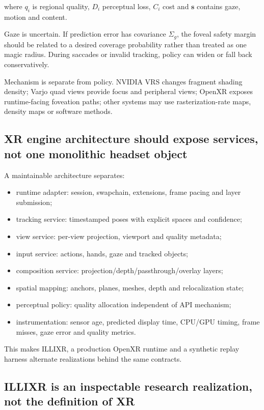 where \(q_i\) is regional quality, \(D_i\) perceptual loss, \(C_i\) cost and \(\mathbf s\) contains gaze, motion and content.

Gaze is uncertain. If prediction error has covariance \(\Sigma_g\), the foveal safety margin should be related to a desired coverage probability rather than treated as one magic radius. During saccades or invalid tracking, policy can widen or fall back conservatively.

Mechanism is separate from policy. NVIDIA VRS changes fragment shading density; Varjo quad views provide focus and peripheral views; OpenXR exposes runtime-facing foveation paths; other systems may use rasterization-rate maps, density maps or software methods.

\subsection{XR engine architecture should expose services, not one monolithic headset object}\label{xr-engine-architecture-should-expose-services-not-one-monolithic-headset-object}

A maintainable architecture separates:

\begin{itemize}
\tightlist
\item
  runtime adapter: session, swapchain, extensions, frame pacing and layer submission;
\item
  tracking service: timestamped poses with explicit spaces and confidence;
\item
  view service: per-view projection, viewport and quality metadata;
\item
  input service: actions, hands, gaze and tracked objects;
\item
  composition service: projection/depth/passthrough/overlay layers;
\item
  spatial mapping: anchors, planes, meshes, depth and relocalization state;
\item
  perceptual policy: quality allocation independent of API mechanism;
\item
  instrumentation: sensor age, predicted display time, CPU/GPU timing, frame misses, gaze error and quality metrics.
\end{itemize}

This makes ILLIXR, a production OpenXR runtime and a synthetic replay harness alternate realizations behind the same contracts.

\subsection{ILLIXR is an inspectable research realization, not the definition of XR}\label{illixr-is-an-inspectable-research-realization-not-the-definition-of-xr}

